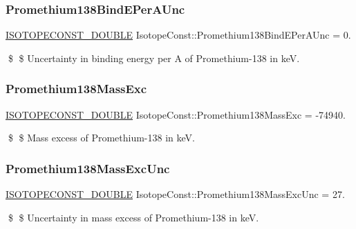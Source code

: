 \subsubsection{\texorpdfstring{Promethium138\+Bind\+E\+Per\+A\+Unc}{Promethium138BindEPerAUnc}}
{\footnotesize\ttfamily \mbox{\hyperlink{group___isotope_const-_macros_ga8f45a7272ce02c0b4c65c44636ed719a}{I\+S\+O\+T\+O\+P\+E\+C\+O\+N\+S\+T\+\_\+\+D\+O\+U\+B\+LE}} Isotope\+Const\+::\+Promethium138\+Bind\+E\+Per\+A\+Unc = 0.}

\$ \$ Uncertainty in binding energy per A of Promethium-\/138 in keV. \mbox{\label{group___isotope_const-_promethium-_pm138_ga419a9439bfa0e5a7499edc2b2c0e02a9}} 
\subsubsection{\texorpdfstring{Promethium138\+Mass\+Exc}{Promethium138MassExc}}
{\footnotesize\ttfamily \mbox{\hyperlink{group___isotope_const-_macros_ga8f45a7272ce02c0b4c65c44636ed719a}{I\+S\+O\+T\+O\+P\+E\+C\+O\+N\+S\+T\+\_\+\+D\+O\+U\+B\+LE}} Isotope\+Const\+::\+Promethium138\+Mass\+Exc = -\/74940.}

\$ \$ Mass excess of Promethium-\/138 in keV. \mbox{\label{group___isotope_const-_promethium-_pm138_ga5b9ccf97a0d5866be8d50b5531c13af3}} 
\subsubsection{\texorpdfstring{Promethium138\+Mass\+Exc\+Unc}{Promethium138MassExcUnc}}
{\footnotesize\ttfamily \mbox{\hyperlink{group___isotope_const-_macros_ga8f45a7272ce02c0b4c65c44636ed719a}{I\+S\+O\+T\+O\+P\+E\+C\+O\+N\+S\+T\+\_\+\+D\+O\+U\+B\+LE}} Isotope\+Const\+::\+Promethium138\+Mass\+Exc\+Unc = 27.}

\$ \$ Uncertainty in mass excess of Promethium-\/138 in keV. \mbox{\label{group___isotope_const-_promethium-_pm138_ga282c929162efffa9ae75f370c3038acc}} 
